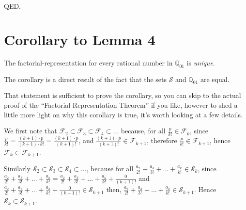 \documentclass{article}
\begin{document}
QED.

\section*{Corollary to Lemma 4}

The factorial-representation for every rational number in \(\mathbb{Q}_{01}\) is \emph{unique}.

The corollary is a direct result of the fact that
the sets \(\mathcal{S}\) and \(\mathbb{Q}_{01}\) are equal.

That statement is sufficient to prove the corollary, so you can skip to
the actual proof of the ``Factorial Representation Theorem'' if you like, however
to shed a little more light on why this corollary is true, it's worth looking at a few details.

We first note that
\(\mathcal{F}_2
\subset \mathcal{F}_3
\subset \mathcal{F}_4
\subset \dots{}\) because,
for all \(\frac{p}{k!} \in \mathcal{F}_k\),
since \(\frac{p}{k!} = \frac{(k+1)\cdot{}p}{(k+1)\cdot{}k!} = \frac{(k+1)\cdot{}p}{(k+1)!}\),
and \(\frac{(k+1)\cdot{}p}{(k+1)!} \in \mathcal{F}_{k+1}\),
therefore \(\frac{p}{k!} \in \mathcal{F}_{k+1}\),
hence \(\mathcal{F}_k \subset \mathcal{F}_{k+1}\).



Similarly
\(\mathcal{S}_2
\subset \mathcal{S}_3
\subset \mathcal{S}_4
\subset \dots{}\), because
for all \(\frac{a_2}{2!}\!+\!\frac{a_3}{3!}\!+\!\dots{}\!+\!\frac{a_k}{k!} \in \mathcal{S}_k\),
since\newline
\(\frac{a_2}{2!}\!+\!\frac{a_3}{3!}\!+\!\dots{}\!+\!\frac{a_k}{k!} =
\frac{a_2}{2!}\!+\!\frac{a_3}{3!}\!+\!\dots{}\!+\!\frac{a_k}{k!}\!+\!\frac{0}{(k+1)!}\)
and
\(\frac{a_2}{2!}\!+\!\frac{a_3}{3!}\!+\!\dots{}\!+\!\frac{a_k}{k!}\!+\!\frac{0}{(k+1)!}
\in \mathcal{S}_{k+1}\) then,\newline
\(\frac{a_2}{2!}\!+\!\frac{a_3}{3!}\!+\!\dots{}\!+\!\frac{a_k}{k!}
\in \mathcal{S}_{k+1}\). Hence 
\(\mathcal{S}_k \subset \mathcal{S}_{k+1}\).
\end{document}

